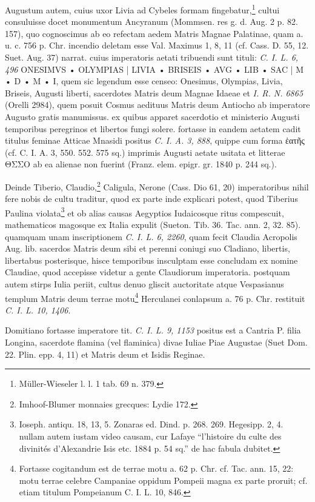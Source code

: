 \documentclass[a4paper, 11pt, oneside, polutonikogreek, german, twocolumn]{article}
\begin{document}
Augustum autem, cuius uxor Livia ad Cybeles formam fingebatur,\footnote{Müller-Wieseler l. l. 1 tab. 69 n. 379.} cultui consuluisse docet monumentum Ancyranum (Mommsen. res g. d. Aug. 2 p. 82. 157), quo cognoscimus ab eo refectam aedem Matris Magnae Palatinae, quam a. u. c. 756 p. Chr. incendio deletam esse Val. Maximus 1, 8, 11 (cf. Cass. D. 55, 12. Suet. Aug. 37) narrat. cuius imperatoris aetati tribuendi sunt tituli: \emph{C. I. L. 6, 496} ONESIMVS • OLYMPIAS | LIVIA • BRISEIS • AVG • LIB • SAC | M • D • M • I, quem sic legendum esse censeo: Onesimus, Olympias, Livia, Briseis, Augusti liberti, sacerdotes Matris deum Magnae Idaeae et \emph{I. R. N. 6865} (Orelli 2984), quem posuit Cosmus aedituus Matris deum Antiocho ab imperatore Augusto gratis manumissus. ex quibus apparet sacerdotio et ministerio Augusti temporibus peregrinos et libertos fungi solere. fortasse in eandem aetatem cadit titulus feminae Atticae Mnasidi positus \emph{C. I. A. 3, 888}, quippe cum forma ἑατῆς (cf. C. I. A. 3, 550. 552. 575 sq.) imprimis Augusti aetate usitata et litterae ΘΣΣΟ ab ea alienae non fuerint (Franz. elem. epigr. gr. 1840 p. 244 sq.).

Deinde Tiberio, Claudio,\footnote{Imhoof-Blumer monnaies grecques: Lydie 172.} Caligula, Nerone (Cass. Dio 61, 20) imperatoribus nihil fere nobis de cultu traditur, quod ex parte inde explicari potest, quod Tiberius Paulina violata\footnote{Ioseph. antiqu. 18, 13, 5. Zonaras ed. Dind. p. 268. 269. Hegesipp. 2, 4. nullam autem iustam video causam, cur Lafaye "`l'histoire du culte des divinités d'Alexandrie Isis etc. 1884 p. 54 sq."' de hac fabula dubitet.} et ob alias causas Aegyptios Iudaicosque ritus compescuit, mathematicos magosque ex Italia expulit (Sueton. Tib. 36. Tac. ann. 2, 32. 85). quamquam unam inscriptionem \emph{C. I. L. 6, 2260}, quam fecit Claudia Acropolis Aug. lib. sacerdos Matris deum sibi et perenni coniugi suo Cladiano, libertis, libertabus posterisque, hisce temporibus insculptam esse concludam ex nomine Claudiae, quod accepisse videtur a gente Claudiorum imperatoria. postquam autem stirps Iulia periit, cultus denuo gliscit auctoritate atque Vespasianus templum Matris deum terrae motu\footnote{Fortasse cogitandum est de terrae motu a. 62 p. Chr. cf. Tac. ann. 15, 22: motu terrae celebre Campaniae oppidum Pompeii magna ex parte proruit; cf. etiam titulum Pompeianum C. I. L. 10, 846.} Herculanei conlapsum a. 76 p. Chr. restituit \emph{C. I. L. 10, 1406}.

Domitiano fortasse imperatore tit. \emph{C. I. L. 9, 1153} positus est a Cantria P. filia Longina, sacerdote flamina (vel flaminica) divae Iuliae Piae Augustae (Suet Dom. 22. Plin. epp. 4, 11) et Matris deum et Isidis Reginae.
\end{document}
